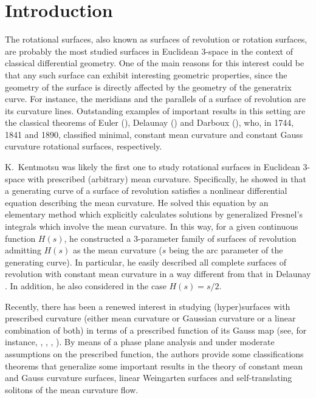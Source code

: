 \documentclass[leqno,11pt]{amsart}
\theoremstyle{definition}
\numberwithin{equation}{section}
\begin{document}
\section{Introduction}

The rotational surfaces, also known as surfaces of revolution or rotation surfaces, are probably the most studied surfaces in Euclidean 3-space in the context of classical differential geometry. One of the main reasons for this interest could be that any such surface can exhibit interesting geometric properties, since the geometry of the surface is directly affected by the geometry of the generatrix curve. For instance, the meridians and the parallels of a surface of revolution are its curvature lines. Outstanding examples of important results in this setting are the classical theorems of Euler (\cite{E44}), Delaunay (\cite{D41}) and Darboux (\cite{D90}), who, in 1744, 1841 and 1890, classified  minimal, constant mean curvature and constant Gauss curvature rotational surfaces, respectively.

K.~Kentmotsu was likely the first one to study rotational surfaces in Euclidean 3-space with prescribed (arbitrary) mean curvature. Specifically, he showed in \cite{Ke80} that a generating curve of a surface of revolution satisfies a nonlinear differential equation describing the mean curvature. He solved this equation by an elementary method which explicitly calculates solutions by generalized
Fresnel's integrals which involve the mean curvature. 
In this way, for a given continuous function $H(s)$, he constructed a 3-parameter family
of surfaces of revolution admitting $H(s)$ as the mean curvature ($s$ being the arc parameter of the generating curve).  In particular, he easily described all complete surfaces of revolution with constant mean curvature in a way different from that in Delaunay \cite{D41}. In addition, he also considered in \cite{Ke80} the case $H(s)=s/2$.

Recently, there has been a renewed interest in studying (hyper)surfaces with prescribed curvature (either mean curvature or Gaussian curvature or a linear combination of both) in terms of a prescribed function of its Gauss map (see, for instance,  \cite{BGM20a}, \cite{BGM20b}, \cite{BO22}, \cite{BO23}). 
By means of a phase plane analysis and under moderate assumptions
on the prescribed function, the authors provide some classifications theorems that generalize some important results in the theory of constant mean and Gauss curvature surfaces, linear Weingarten surfaces and self-translating solitons of the mean curvature flow.
\end{document}
